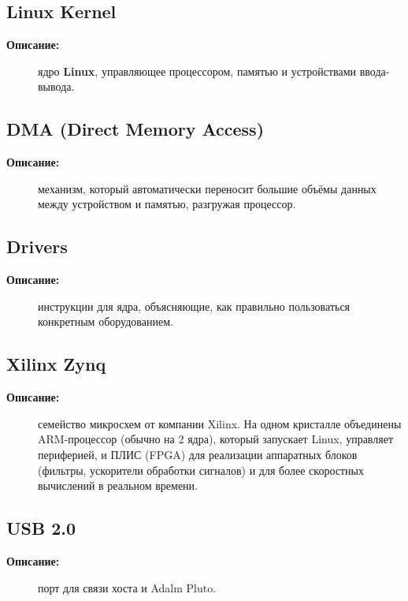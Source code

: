 \subsection*{\textbf{Linux Kernel}}
\begin{description}
  \item[\textbf{Описание:}] ядро \textbf{Linux}, управляющее процессором, памятью и устройствами ввода-вывода.
\end{description}

\subsection*{\textbf{DMA (Direct Memory Access)}}
\begin{description}
  \item[\textbf{Описание:}] механизм, который автоматически переносит большие объёмы данных между устройством и памятью, разгружая процессор.
\end{description}

\subsection*{\textbf{Drivers}}
\begin{description}
  \item[\textbf{Описание:}] инструкции для ядра, объясняющие, как правильно пользоваться конкретным оборудованием.
\end{description}

\subsection*{\textbf{Xilinx Zynq}}
\begin{description}
  \item[\textbf{Описание:}] семейство микросхем от компании Xilinx. На одном кристалле 
  объединены ARM-процессор (обычно на 2 ядра), который запускает Linux, управляет периферией, и ПЛИС (FPGA) для реализации аппаратных блоков (фильтры, ускорители обработки сигналов) и для более скоростных вычислений в реальном времени. 
\end{description}

\subsection*{\textbf{USB 2.0}}
\begin{description}
  \item[\textbf{Описание:}] порт для связи хоста и Adalm Pluto.
\end{description}

